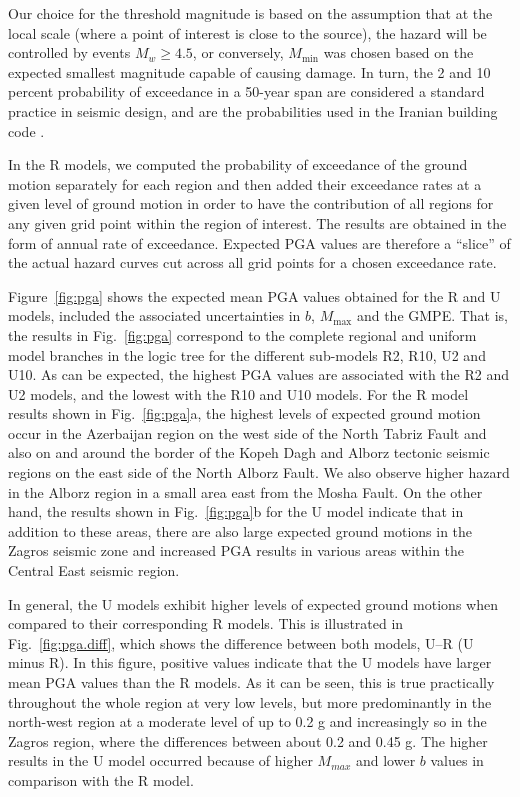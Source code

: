Our choice for the threshold magnitude is based on the assumption that at the local scale (where a point of interest is close to the source), the hazard will be controlled by events $M_w \geq 4.5$, or conversely, $M_{\min}$ was chosen based on the expected smallest magnitude capable of causing damage. In turn, the 2 and 10 percent probability of exceedance in a 50-year span are considered a standard practice in seismic design, and are the probabilities used in the Iranian building code \citep{BHRC2014}.

In the R models, we computed the probability of exceedance of the ground motion separately for each region and then added their exceedance rates at a given level of ground motion in order to have the contribution of all regions for any given grid point within the region of interest. The results are obtained in the form of annual rate of exceedance. Expected PGA values are therefore a ``slice'' of the actual hazard curves cut across all grid points for a chosen exceedance rate.

Figure~\ref{fig:pga} shows the expected mean PGA values obtained for the R and U models, included the associated uncertainties in $b$, $M_{\max}$ and the GMPE. That is, the results in Fig.~\ref{fig:pga} correspond to the complete regional and uniform model branches in the logic tree for the different sub-models R2, R10, U2 and U10. As can be expected, the highest PGA values are associated with the R2 and U2 models, and the lowest with the R10 and U10 models. For the R model results shown in Fig.~\ref{fig:pga}a, the highest levels of expected ground motion occur in the Azerbaijan region on the west side of the North Tabriz Fault and also on and around the border of the Kopeh Dagh and Alborz tectonic seismic regions on the east side of the North Alborz Fault. We also observe higher hazard in the Alborz region in a small area east from the Mosha Fault. On the other hand, the results shown in Fig.~\ref{fig:pga}b for the U model indicate that in addition to these areas, there are also large expected ground motions in the Zagros seismic zone and increased PGA results in various areas within the Central East seismic region.

In general, the U models exhibit higher levels of expected ground motions when compared to their corresponding R models. This is illustrated in Fig.~\ref{fig:pga.diff}, which shows the difference between both models, U--R (U minus R). In this figure, positive values indicate that the U models have larger mean PGA values than the R models. As it can be seen, this is true practically throughout the whole region at very low levels, but more predominantly in the north-west region at a moderate level of up to 0.2 g and increasingly so in the Zagros region, where the differences between about 0.2 and 0.45 g. The higher results in the U model occurred because of higher $M_{max}$ and lower $b$ values in comparison with the R model.

